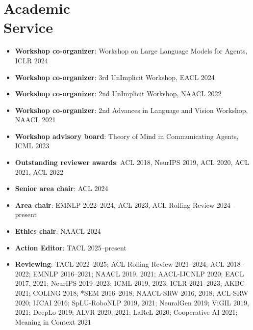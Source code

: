 \section{Academic \\ Service}
\begin{itemize}[leftmargin=-0.4mm,partopsep=0pt,label=]
  \item \textbf{Workshop co-organizer}: Workshop on Large Language Models for Agents, ICLR 2024

  \item \textbf{Workshop co-organizer}: 3rd UnImplicit Workshop, EACL 2024

  \item \textbf{Workshop co-organizer}: 2nd UnImplicit Workshop, NAACL 2022

  \item \textbf{Workshop co-organizer}: 2nd Advances in Language and Vision Workshop, NAACL 2021

  \item \textbf{Workshop advisory board}: Theory of Mind in Communicating Agents, ICML 2023

  \item \textbf{Outstanding reviewer awards}: ACL 2018, NeurIPS 2019, ACL 2020, ACL 2021, ACL 2022

  \item \textbf{Senior area chair}: ACL 2024

  \item \textbf{Area chair}: EMNLP 2022--2024, ACL 2023, ACL Rolling Review 2024--present

  \item \textbf{Ethics chair}: NAACL 2024

  \item \textbf{Action Editor}: TACL 2025--present

  \item \textbf{Reviewing}: TACL 2022--2025; ACL Rolling Review 2021--2024; ACL 2018--2022; EMNLP 2016--2021; NAACL 2019, 2021; AACL-IJCNLP 2020; EACL 2017, 2021; NeurIPS 2019--2023; ICML 2019, 2023; ICLR 2021--2023; AKBC 2021; COLING 2018; *SEM 2016--2018; NAACL-SRW 2016, 2018; ACL-SRW 2020; IJCAI 2016; SpLU-RoboNLP 2019, 2021; NeuralGen 2019; ViGIL 2019, 2021; DeepLo 2019; ALVR 2020, 2021; LaReL 2020; Cooperative AI 2021; Meaning in Context 2021  \\





\end{itemize}


